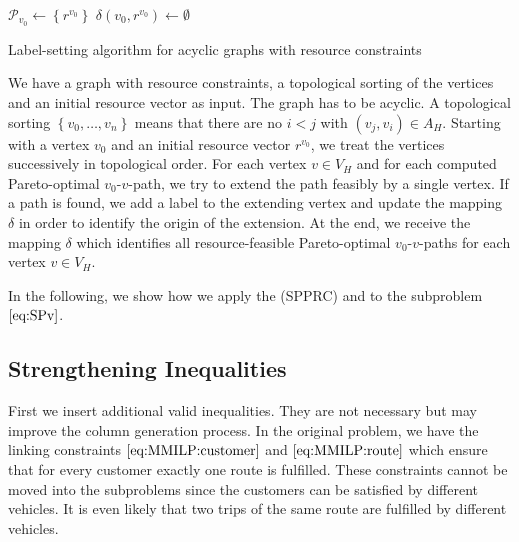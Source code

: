 \begin{algorithm}[hbt]
	\SetAlgoLined
	$\mathcal{P}_{v_0}\gets\left\{r^{v_0}\right\}$ \;
	$\delta\left(v_0,r^{v_0}\right)\gets\emptyset$ \;
	\Return{$\delta$}
	\caption{Label-setting algorithm for acyclic graphs with resource constraints}
	\label{alg:label_setting}
\end{algorithm}

We have a graph with resource constraints, a topological sorting of the vertices and an initial resource vector as input. The graph has to be acyclic. A topological sorting ${\left\{v_0,\dots,v_n\right\}}$ means that there are no $i<j$ with ${\left(v_j,v_i\right)\in A_H}$. Starting with a vertex $v_0$ and an initial resource vector $r^{v_0}$, we treat the vertices successively in topological order. For each vertex $v\in V_H$ and for each computed Pareto-optimal $v_0$-$v$-path, we try to extend the path feasibly by a single vertex. If a path is found, we add a label to the extending vertex and update the mapping $\delta$ in order to identify the origin of the extension. At the end, we receive the mapping $\delta$ which identifies all resource-feasible Pareto-optimal $v_0$-$v$-paths for each vertex $v\in V_H$.

In the following, we show how we apply the (SPPRC) and  to the subproblem $\eqref{eq:SPv}$.


\subsection{Strengthening Inequalities}

First we insert additional valid inequalities. They are not necessary but may improve the column generation process. In the original problem, we have the linking constraints $\eqref{eq:MMILP:customer}$ and $\eqref{eq:MMILP:route}$ which ensure that for every customer exactly one route is fulfilled. These constraints cannot be moved into the subproblems since the customers can be satisfied by different vehicles. It is even likely that two trips of the same route are fulfilled by different vehicles.

